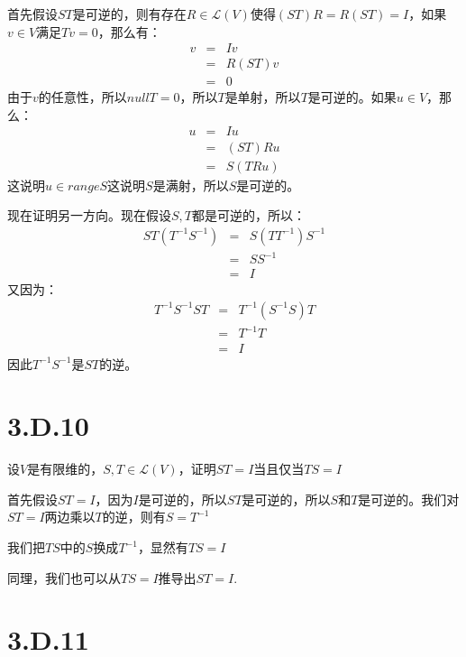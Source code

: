 \documentclass[10pt,a4paper,UTF8]{article}
\begin{document}
\begin{answer}
首先假设\(ST\)是可逆的，则有存在\(R\in \mathcal{L}(V)\)使得\((ST)R = R(ST) = I\)，如果\(v\in V\)满足\(Tv = 0\)，那么有：
\begin{eqnarray*}
v &=&Iv \\
&=&R(ST)v \\
&=&  0
\end{eqnarray*}
由于\(v\)的任意性，所以\(nullT = 0\)，所以\(T\)是单射，所以\(T\)是可逆的。如果\(u\in V\)，那么：
\begin{eqnarray*}
u&=&Iu \\
&=&(ST)Ru \\
&=&S(TRu)
\end{eqnarray*}
这说明\(u\in rangeS\)这说明\(S\)是满射，所以\(S\)是可逆的。

现在证明另一方向。现在假设\(S,T\)都是可逆的，所以：
\begin{eqnarray*}
ST(T^{-1}S^{-1})&=&S(TT^{-1})S^{-1} \\
&=&SS^{-1} \\
&=& I
\end{eqnarray*}
又因为：
\begin{eqnarray*}
T^{-1}S^{-1}ST&=&T^{-1}(S^{-1}S)T \\
&=&T^{-1}T \\
&=& I
\end{eqnarray*}
因此\(T^{-1}S^{-1}\)是\(ST\)的逆。
\end{answer}
\section{3.D.10}
\label{sec:org12793c8}


\begin{problem}
设\(V\)是有限维的，\(S,T\in \mathcal{L}(V)\)，证明\(ST=I\)当且仅当\(TS = I\)
\end{problem}

\begin{answer}
首先假设\(ST=I\)，因为\(I\)是可逆的，所以\(ST\)是可逆的，所以\(S\)和\(T\)是可逆的。我们对\(ST=I\)两边乘以\(T\)的逆，则有\(S=T^{-1}\)

我们把\(TS\)中的\(S\)换成\(T^{-1}\)，显然有\(TS = I\)

同理，我们也可以从\(TS = I\)推导出\(ST = I\).
\end{answer}
\section{3.D.11}
\label{sec:org394b228}
\end{document}
